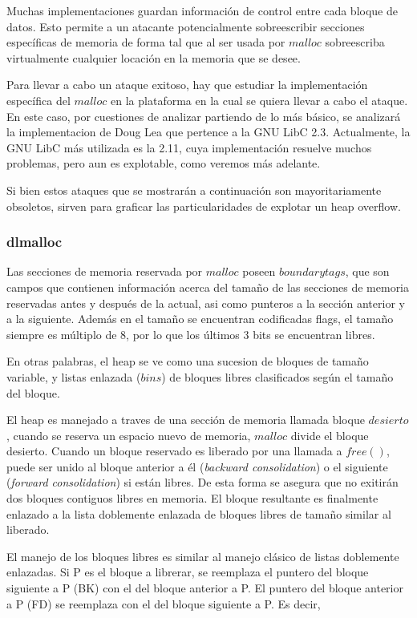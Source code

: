 	Muchas implementaciones guardan informaci\'on de control entre cada bloque de datos. Esto permite a un atacante potencialmente sobreescribir secciones espec\'ificas de memoria de forma tal que al ser usada por $malloc$ sobreescriba virtualmente cualquier locaci\'on en la memoria que se desee.
	
	Para llevar a cabo un ataque exitoso, hay que estudiar la implementaci\'on espec\'ifica del $malloc$ en la plataforma en la cual se quiera llevar a cabo el ataque. En este caso, por cuestiones de analizar partiendo de lo m\'as b\'asico, se analizar\'a la implementacion de Doug Lea que pertence a la GNU LibC 2.3. Actualmente, la GNU LibC m\'as utilizada es la 2.11, cuya implementaci\'on resuelve muchos problemas, pero aun es explotable, como veremos m\'as adelante. 
	
	Si bien estos ataques que se mostrar\'an a continuaci\'on son mayoritariamente obsoletos, sirven para graficar las particularidades de explotar un heap overflow.
	
	\subsubsection{dlmalloc}
	
	Las secciones de memoria reservada por $malloc$ poseen $boundary tags$, que son campos que contienen informaci\'on acerca del tama\~no de las secciones de memoria reservadas antes y despu\'es de la actual, asi como punteros a la secci\'on anterior y a la siguiente. Adem\'as en el tama\~no se encuentran codificadas flags, el tama\~no siempre es m\'ultiplo de 8, por lo que los \'ultimos 3 bits se encuentran libres.
	
	En otras palabras, el heap se ve como una sucesion de bloques de tama\~no variable, y listas enlazada ($bins$) de bloques libres clasificados seg\'un el tama\~no del bloque.
	
	El heap es manejado a traves de una secci\'on de memoria llamada bloque $desierto$, cuando se reserva un espacio nuevo de memoria, $malloc$ divide el bloque desierto. Cuando un bloque reservado es liberado por una llamada a $free()$, puede ser unido al bloque anterior a \'el ({\em backward consolidation}) o el siguiente ({\em forward consolidation}) si est\'an libres. De esta forma se asegura que no exitir\'an dos bloques contiguos libres en memoria. El bloque resultante es finalmente enlazado a la lista doblemente enlazada de bloques libres de tama\~no similar al liberado.
	
	El manejo de los bloques libres es similar al manejo cl\'asico de listas doblemente enlazadas. Si P es el bloque a librerar, se reemplaza el puntero del bloque siguiente a P (BK) con el del bloque anterior a P. El puntero del bloque anterior a P (FD) se reemplaza con el del bloque siguiente a P. Es decir,
	

